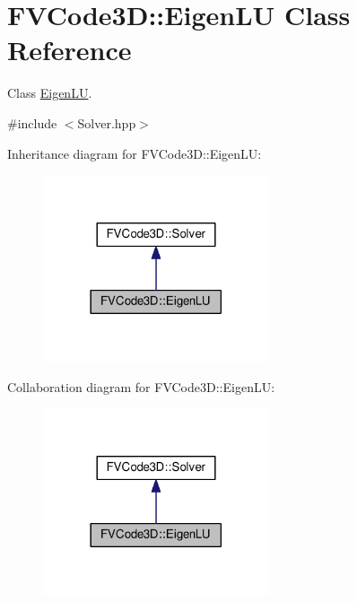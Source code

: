 \hypertarget{classFVCode3D_1_1EigenLU}{}\section{F\+V\+Code3D\+:\+:Eigen\+LU Class Reference}
\label{classFVCode3D_1_1EigenLU}


Class \hyperlink{classFVCode3D_1_1EigenLU}{Eigen\+LU}.  




{\ttfamily \#include $<$Solver.\+hpp$>$}



Inheritance diagram for F\+V\+Code3D\+:\+:Eigen\+LU\+:
\nopagebreak
\begin{figure}[H]
\begin{center}
\leavevmode
\includegraphics[width=189pt]{classFVCode3D_1_1EigenLU__inherit__graph}
\end{center}
\end{figure}


Collaboration diagram for F\+V\+Code3D\+:\+:Eigen\+LU\+:
\nopagebreak
\begin{figure}[H]
\begin{center}
\leavevmode
\includegraphics[width=189pt]{classFVCode3D_1_1EigenLU__coll__graph}
\end{center}
\end{figure}
